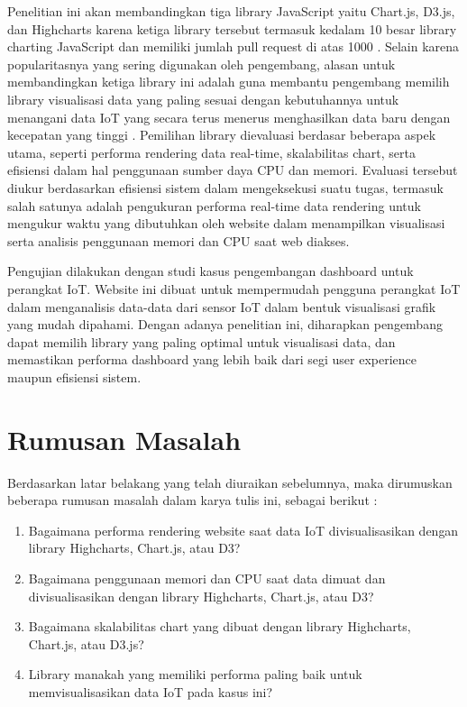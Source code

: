 {Penelitian ini  akan membandingkan tiga library JavaScript yaitu Chart.js, D3.js, dan Highcharts karena ketiga library tersebut termasuk kedalam 10 besar library charting JavaScript dan memiliki jumlah pull request di atas 1000 \cite{ossinsight}. Selain karena popularitasnya yang sering digunakan oleh pengembang, alasan untuk membandingkan ketiga library ini adalah guna membantu pengembang memilih library visualisasi data yang paling sesuai dengan kebutuhannya untuk menangani data IoT yang secara terus menerus menghasilkan data baru dengan kecepatan yang tinggi \cite{Khairy2023}. Pemilihan library dievaluasi berdasar beberapa aspek utama, seperti performa rendering data real-time, skalabilitas chart, serta efisiensi dalam hal penggunaan sumber daya CPU dan memori. Evaluasi tersebut diukur berdasarkan efisiensi sistem dalam mengeksekusi suatu tugas, termasuk salah satunya adalah pengukuran performa real-time data rendering untuk mengukur waktu yang dibutuhkan oleh website dalam menampilkan visualisasi \cite{Persson2021} serta analisis penggunaan memori dan CPU saat web diakses.

Pengujian dilakukan dengan studi kasus pengembangan dashboard untuk perangkat IoT. Website ini dibuat untuk mempermudah pengguna perangkat IoT dalam menganalisis data-data dari sensor IoT dalam bentuk visualisasi grafik yang mudah dipahami. Dengan adanya penelitian ini, diharapkan pengembang dapat memilih library yang paling optimal untuk visualisasi data, dan memastikan performa dashboard yang lebih baik dari segi user experience maupun efisiensi sistem.

\section{Rumusan Masalah}
Berdasarkan latar belakang yang telah diuraikan sebelumnya, maka dirumuskan beberapa rumusan masalah dalam karya tulis ini, sebagai berikut :
\begin{enumerate}
    \item Bagaimana performa rendering website saat data IoT divisualisasikan dengan library Highcharts, Chart.js, atau D3? 
    \item Bagaimana penggunaan memori dan CPU saat data dimuat dan divisualisasikan dengan library Highcharts, Chart.js, atau D3? 
    \item Bagaimana skalabilitas chart yang dibuat dengan library Highcharts, Chart.js, atau D3.js? 
    \item Library manakah yang memiliki performa paling baik untuk memvisualisasikan data IoT pada kasus ini? 
\end{enumerate}

}

